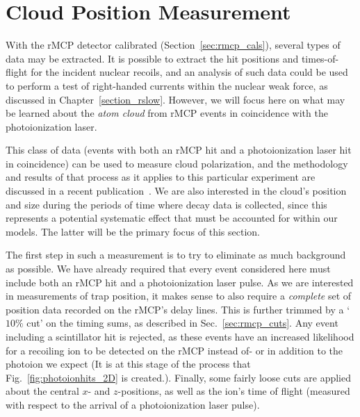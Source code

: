 \FloatBarrier
\section{Cloud Position Measurement}
\label{sec:cloud_calibration}
With the \ac{rMCP} detector calibrated (Section~\ref{sec:rmcp_cals}), several types of data may be extracted.  It is possible to extract the hit positions and times-of-flight for the incident nuclear recoils, and an analysis of such data could be used to perform a test of right-handed currents within the nuclear weak force, as discussed in Chapter~\ref{section_rslow}.  However, we will focus here on what may be learned about the \emph{atom cloud} from rMCP events in coincidence with the photoionization laser.~  

This class of data (events with both an \ac{rMCP} hit and a photoionization laser hit in coincidence) can be used to measure cloud polarization, and the methodology and results of that process as it applies to this particular experiment are discussed in a recent publication~\cite{ben_OP}.  We are also interested in the cloud's position and size during the periods of time where decay data is collected, since this represents a potential systematic effect that must be accounted for within our models.  The latter will be the primary focus of this section.  

The first step in such a measurement is to try to eliminate as much background as possible.  We have already required that every event considered here must include both an rMCP hit and a photoionization laser pulse.  As we are interested in measurements of trap position, it makes sense to also require a \emph{complete} set of position data recorded on the \ac{rMCP}'s delay lines.   This is further trimmed by a `$10\%$ cut' on the timing sums, as described in Sec.~\ref{sec:rmcp_cuts}.  Any event including a scintillator hit is rejected, as these events have an increased likelihood for a recoiling ion to be detected on the rMCP instead of- or in addition to the photoion we expect (It is at this stage of the process that Fig.~\ref{fig:photoionhits_2D} is created.).  Finally, some fairly loose cuts are applied about the central $x$- and $z$-positions, as well as the ion's time of flight (measured with respect to the arrival of a photoionization laser pulse).


